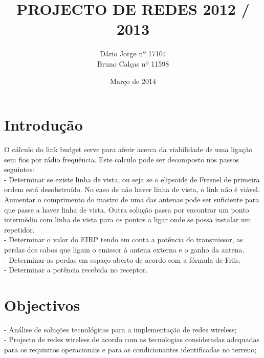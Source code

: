 \documentclass[a4paper,titlepage]{article}
\title{PROJECTO DE REDES 2012 / 2013}
\author{
	Dário Jorge  nº 17104\\
	Bruno Calças nº 11598\\
}
\date{Março de 2014}
\begin{document}
	\maketitle
	
	\newpage
	
	\tableofcontents
	
	\newpage
	
	\section{Introdução}
		O cálculo do link budget serve para aferir acerca da viabilidade de uma ligação sem fios
	por rádio frequência. Este calculo pode ser decomposto nos passos seguintes:\\
		- Determinar se existe linha de vista, ou seja se o elipsoide de Fresnel de primeira
	ordem está desobstruído. No caso de não haver linha de vista, o link não é viável.\\
	Aumentar o comprimento do mastro de uma das antenas pode ser suficiente para
	que passe a haver linha de vista. Outra solução passa por encontrar um ponto
	intermédio com linha de vista para os pontos a ligar onde se possa instalar um repetidor.\\
		- Determinar o valor do EIRP tendo em conta a potência do transmissor, as perdas
	dos cabos que ligam o emissor à antena externa e o ganho da antena.\\
		- Determinar as perdas em espaço aberto de acordo com a fórmula de Friis.\\
		- Determinar a potência recebida no receptor.\\
		
	\section{Objectivos}
		- Análise de soluções tecnológicas para a implementação de redes wireless;\\
		- Projecto de redes wireless de acordo com as tecnologias consideradas adequadas
	para os requisitos operacionais e para as condicionantes identificadas no terreno;\\
		
\end{document}
